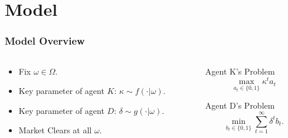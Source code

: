 \documentclass[10pt, mathserif, aspectratio = 169]{beamer}
\begin{document}
\section{Model}

\begin{frame}
\frametitle{Model Overview}
\begin{columns}

\begin{column}{0.5\textwidth}
\begin{itemize}\setlength\itemsep{3em}
\item<1-> Fix $\omega \in \Omega$. 
\item<2-> Key parameter of agent $K$: $\kappa \sim  f(\cdot \vert \omega)$. 
\item<3-> Key parameter of agent $D$: $\delta \sim g(\cdot \vert \omega)$. 
\item<4-> Market Clears at all $\omega$. 
\end{itemize}
\end{column}

\pause
\begin{column}{0.4\textwidth}
\begin{center}
\begin{block}{Agent K's Problem}
\begin{equation*}
\max_{a_t\in \{0, 1\}} \kappa^t a_t
\end{equation*}
\end{block} 

\pause\vspace{2em}

\begin{block}{Agent D's Problem}
\begin{equation*}
\min_{b_t\in \{0, 1\}}\sum_{t = 1}^\infty \delta^t b_t. 
\end{equation*}
\end{block}
\end{center}

\end{column}

\end{columns}

\end{frame}
\end{document}
